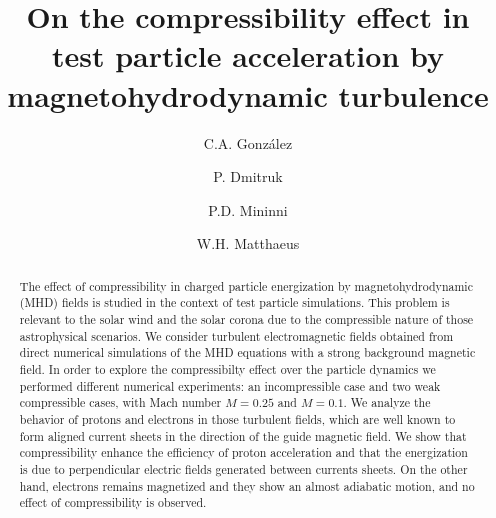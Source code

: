 \documentclass[%
aip,pop,amsmath,amssymb,
 reprint,%
]{revtex4-1}
\begin{document}



\title[]{On the compressibility effect in test particle acceleration 
by magnetohydrodynamic turbulence}%
\author{C.A. Gonz\'alez}
\author{P. Dmitruk}
\author{P.D. Mininni}
 \
\author{W.H. Matthaeus}
\



\begin{abstract}
The effect of compressibility in charged particle energization by 
magnetohydrodynamic (MHD) fields
is studied in the context of test particle simulations. 
This problem is relevant 
to the solar wind and the solar corona due to the compressible 
nature of those astrophysical 
scenarios. We consider turbulent electromagnetic fields obtained from  
direct numerical simulations 
of the MHD equations with a strong background magnetic field.  
In order to explore the compressibilty effect over the particle dynamics 
we performed
different numerical experiments: an incompressible case and two weak 
compressible cases, with 
Mach number $M=0.25$ and $M=0.1$. 
We analyze the behavior of protons 
and electrons in those turbulent fields,  which are well known to form 
aligned current sheets in 
the direction of the guide magnetic field. 
We show that compressibility enhance the 
efficiency of proton acceleration and that the energization 
is due to perpendicular electric 
fields generated between currents sheets. On the other hand, 
electrons remains magnetized and 
they show an almost adiabatic motion, and no effect of compressibility 
is observed.
\end{abstract}

\maketitle
\end{document}
